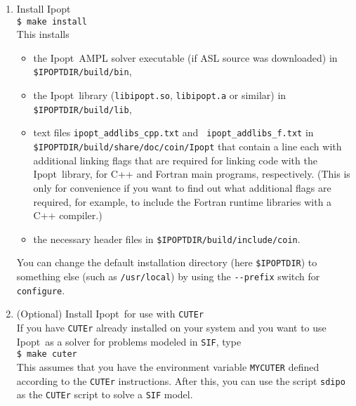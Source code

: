 \documentclass[10pt]{article}
\newcommand{\Ipopt}{{\sc Ipopt}}
\begin{document}
\begin{enumerate}
  Note: The {\tt configure} script is not able to automatically
  determine the C++ runtime libraries for the C++ compiler.  For
  certain compilers we enabled default values for this, but those
  might not exist or be wrong for your compiler.  In that case, the C
  and Fortran example in the test will most probably fail to compile.
  If you don't want to hook up the compiled \Ipopt\ library to some
  Fortran or C code that you wrote you don't need to worry about this.
  If you do want to link the \Ipopt\ library with a C or Fortran
  compiler, you need to find out the C++ runtime libraries (e.g., by
  running the C++ compiler in verbose mode for a simple example
  program) and run {\tt configure} again, and this time specify all
  C++ runtime libraries with the {\tt CXXLIBS} variable (see also
  Appendix~\ref{ExpertInstall}).
\item Install \Ipopt \\
  {\tt \$ make install}\\
  This installs
  \begin{itemize}
  \item the \Ipopt\ AMPL solver executable (if ASL source was
    downloaded) in \texttt{\$IPOPTDIR/build/bin},
  \item the \Ipopt\ library (\texttt{libipopt.so}, \texttt{libipopt.a}
    or similar) in \texttt{\$IPOPTDIR/build/lib},
  \item text files {\tt ipopt\_addlibs\_cpp.txt} and {\tt
      ipopt\_addlibs\_f.txt} in \texttt{\$IPOPTDIR/build/share/doc/coin/Ipopt} that contain a
    line each with additional linking flags that are required for
    linking code with the \Ipopt\ library, for C++ and Fortran main
    programs, respectively. (This is only for convenience if you want
    to find out what additional flags are required, for example, to
    include the Fortran runtime libraries with a C++ compiler.)
  \item the necessary header files in
    \texttt{\$IPOPTDIR/build/include/coin}.
  \end{itemize}
  You can change the default installation directory (here
  \texttt{\$IPOPTDIR}) to something else (such as \texttt{/usr/local})
  by using the \verb|--prefix| switch for \texttt{configure}.
\item (Optional) Install \Ipopt\ for use with {\tt CUTEr}\\
  If you have {\tt CUTEr} already installed on your system and you
  want to use \Ipopt\ as a solver for problems modeled in {\tt SIF},
  type\\
  {\tt \$ make cuter}\\
  This assumes that you have the environment variable {\tt MYCUTER}
  defined according to the {\tt CUTEr} instructions.  After this, you
  can use the script {\tt sdipo} as the {\tt CUTEr} script to solve a
  {\tt SIF} model.
\end{enumerate}
\end{document}
